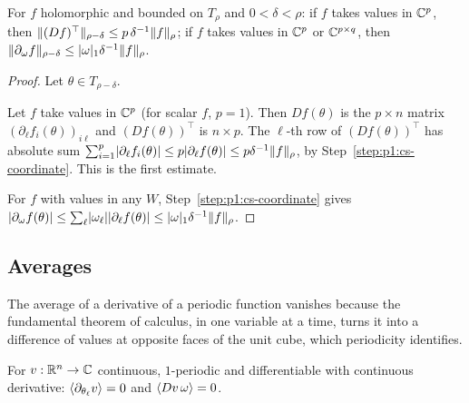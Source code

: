 \begin{lemma}\label{bp:p1:cauchy-corollaries}
For $f$ holomorphic and bounded on $T_\rho$ and $0<\delta<\rho$: if $f$ takes values in $\mathbb{C}^p$, then
$\lVert (Df)^\top\rVert_{\rho-\delta}\le p\,\delta^{-1}\lVert f\rVert_\rho$; if $f$ takes values in $\mathbb{C}^p$ or
$\mathbb{C}^{p\times q}$, then $\lVert \partial_\omega f\rVert_{\rho-\delta}\le\lvert \omega\rvert_1\delta^{-1}\lVert f\rVert_\rho$.
\end{lemma}

\begin{proof}
Let $\theta\in T_{\rho-\delta}$.

\label{step:p1:cc-transpose}
Let $f$ take values in $\mathbb{C}^p$ (for scalar $f$, $p=1$). Then $Df(\theta)$ is the $p\times n$ matrix
$(\partial_\ell f_i(\theta))_{i\ell}$ and $(Df(\theta))^\top$ is $n\times p$. The $\ell$-th row of
$(Df(\theta))^\top$ has absolute sum $\sum_{i=1}^p\lvert \partial_\ell f_i(\theta)\rvert\le
p\lvert \partial_\ell f(\theta)\rvert\le p\delta^{-1}\lVert f\rVert_\rho$, by Step~\ref{step:p1:cs-coordinate}. This is
the first estimate.

\label{step:p1:cc-omega}
For $f$ with values in any $W$, Step~\ref{step:p1:cs-coordinate} gives
$\lvert \partial_\omega f(\theta)\rvert\le\sum_\ell\lvert \omega_\ell\rvert\lvert \partial_\ell f(\theta)\rvert\le
\lvert \omega\rvert_1\delta^{-1}\lVert f\rVert_\rho$.
\end{proof}

\subsection{Averages}\label{bp:p1:sec-averages}

The average of a derivative of a periodic function vanishes because the fundamental theorem of
calculus, in one variable at a time, turns it into a difference of values at opposite faces of the
unit cube, which periodicity identifies.

\begin{lemma}\label{bp:p1:averages-real}
For $v:\mathbb{R}^n\to\mathbb{C}$ continuous, $1$-periodic and differentiable with continuous derivative:
$\langle \partial_{\theta_\ell}v\rangle=0$ and $\langle Dv\,\omega\rangle=0$.
\end{lemma}

